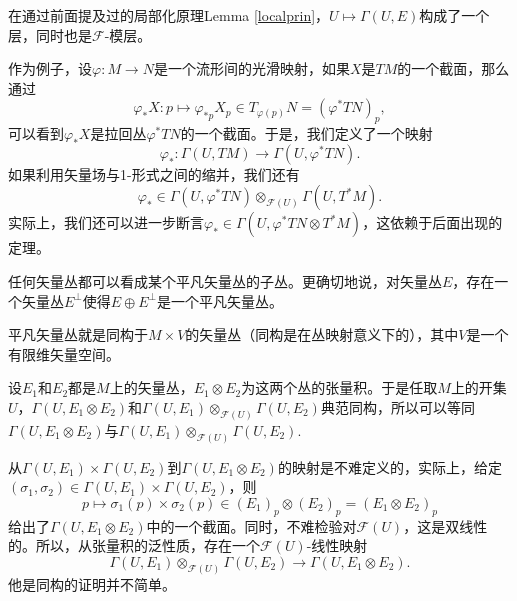 在通过前面提及过的局部化原理Lemma \ref{localprin}，$U\mapsto \Gamma(U,E)$构成了一个层，同时也是$\mathcal{F}$-模层。

\begin{para}
作为例子，设$\varphi:M\to N$是一个流形间的光滑映射，如果$X$是$TM$的一个截面，那么通过
\[
	\varphi_* X:p\mapsto \varphi_{*p}X_p\in T_{\varphi(p)}N=(\varphi^*TN)_p,
\]
可以看到$\varphi_* X$是拉回丛$\varphi^*TN$的一个截面。于是，我们定义了一个映射
\[
	\varphi_*:\Gamma(U,TM)\to \Gamma(U,\varphi^*TN).
\]
如果利用矢量场与1-形式之间的缩并，我们还有
\[
	\varphi_*\in \Gamma(U,\varphi^*TN)\otimes_{\mathcal{F}(U)} \Gamma(U,T^*M).
\]
实际上，我们还可以进一步断言$\varphi_*\in \Gamma(U,\varphi^*TN\otimes T^*M)$，这依赖于后面出现的定理。
\end{para}


\begin{pro}
任何矢量丛都可以看成某个平凡矢量丛的子丛。更确切地说，对矢量丛$E$，存在一个矢量丛$E^\bot$使得$E\oplus E^\bot$是一个平凡矢量丛。
\end{pro}

平凡矢量丛就是同构于$M\times V$的矢量丛（同构是在丛映射意义下的），其中$V$是一个有限维矢量空间。

\begin{thm}
设$E_1$和$E_2$都是$M$上的矢量丛，$E_1\otimes E_2$为这两个丛的张量积。于是任取$M$上的开集$U$，$\Gamma(U,E_1\otimes E_2)$和$\Gamma(U,E_1)\otimes_{\mathcal{F}(U)} \Gamma(U,E_2)$典范同构，所以可以等同$\Gamma(U,E_1\otimes E_2)$与$\Gamma(U,E_1)\otimes_{\mathcal{F}(U)} \Gamma(U,E_2)$.
\end{thm}

从$\Gamma(U,E_1)\times \Gamma(U,E_2)$到$\Gamma(U,E_1\otimes E_2)$的映射是不难定义的，实际上，给定$(\sigma_1,\sigma_2)\in \Gamma(U,E_1)\times \Gamma(U,E_2)$，则
\[
	p\mapsto \sigma_1(p)\times \sigma_2(p)\in (E_1)_p\otimes (E_2)_p=(E_1\otimes E_2)_p
\]
给出了$\Gamma(U,E_1\otimes E_2)$中的一个截面。同时，不难检验对$\mathcal{F}(U)$，这是双线性的。所以，从张量积的泛性质，存在一个$\mathcal{F}(U)$-线性映射
\[
	\Gamma(U,E_1)\otimes_{\mathcal{F}(U)} \Gamma(U,E_2)\to \Gamma(U,E_1\otimes E_2).
\]
他是同构的证明并不简单。

